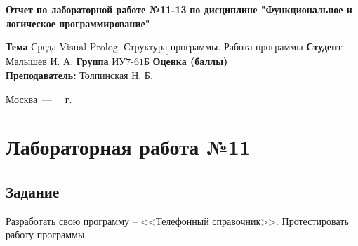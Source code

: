 \documentclass[12pt]{report}
\begin{document}
\begin{titlepage}
		
		\begin{center}
			\noindent\begin{minipage}{1.3\textwidth}\centering
				\Large\textbf{  Отчет по лабораторной работе №11-13}\newline
				\textbf{по дисциплине \newline "Функциональное и логическое программирование"}\newline\newline
			\end{minipage}
		\end{center}
		
		\noindent\textbf{Тема} $\underline{\text{Среда Visual Prolog. Структура программы. Работа программы}}$\newline\newline
		\noindent\textbf{Студент} $\underline{\text{Малышев И. А.}}$\newline\newline
		\noindent\textbf{Группа} $\underline{\text{ИУ7-61Б}}$\newline\newline
		\noindent\textbf{Оценка (баллы)} $\underline{\text{~~~~~~~~~~~~~~~~~~~~~~~~~~~}}$\newline\newline
		\noindent\textbf{Преподаватель: } $\underline{\text{Толпинская Н. Б.}}$\newline\newline\newline
		
		\begin{center}
			\vfill
			Москва~---~\the\year
			~г.
		\end{center}
	\end{titlepage}
	
	
	\setcounter{page}{2}

\chapter*{Лабораторная работа №11}
\section*{Задание}

Разработать свою программу -- <<Телефонный справочник>>. Протестировать работу программы.
\end{document}
